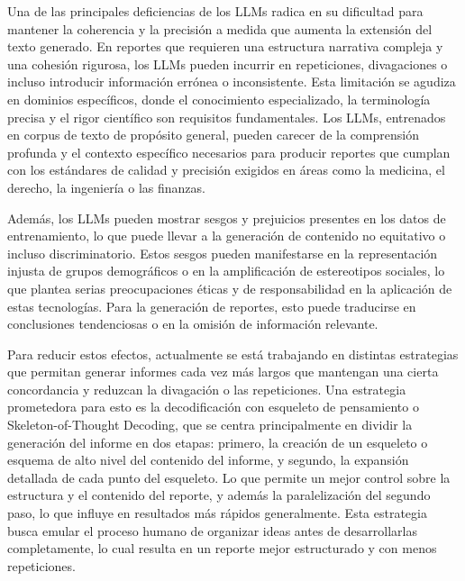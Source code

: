 Una de las principales deficiencias de los LLMs radica en su dificultad para mantener la coherencia y la precisión a medida que aumenta la extensión del texto generado. En reportes que requieren una estructura narrativa compleja y una cohesión rigurosa, los LLMs pueden incurrir en repeticiones, divagaciones o incluso introducir información errónea o inconsistente. Esta limitación se agudiza en dominios específicos, donde el conocimiento especializado, la terminología precisa y el rigor científico son requisitos fundamentales. Los LLMs, entrenados en corpus de texto de propósito general, pueden carecer de la comprensión profunda y el contexto específico necesarios para producir reportes que cumplan con los estándares de calidad y precisión exigidos en áreas como la medicina, el derecho, la ingeniería o las finanzas.

Además, los LLMs pueden mostrar sesgos y prejuicios presentes en los datos de entrenamiento, lo que puede llevar a la generación de contenido no equitativo o incluso discriminatorio. Estos sesgos pueden manifestarse en la representación injusta de grupos demográficos o en la amplificación de estereotipos sociales, lo que plantea serias preocupaciones éticas y de responsabilidad en la aplicación de estas tecnologías. Para la generación de reportes, esto puede traducirse en conclusiones tendenciosas o en la omisión de información relevante.

Para reducir estos efectos, actualmente se está trabajando en distintas estrategias que permitan generar informes cada vez más largos que mantengan una cierta concordancia y reduzcan la divagación o las repeticiones. Una estrategia prometedora para esto es la decodificación con esqueleto de pensamiento o Skeleton-of-Thought Decoding, que se centra principalmente en dividir la generación del informe en dos etapas: primero, la creación de un esqueleto o esquema de alto nivel del contenido del informe, y segundo, la expansión detallada de cada punto del esqueleto. Lo que permite un mejor control sobre la estructura y el contenido del reporte, y además la paralelización del segundo paso, lo que influye en resultados más rápidos generalmente. Esta estrategia busca emular el proceso humano de organizar ideas antes de desarrollarlas completamente, lo cual resulta en un reporte mejor estructurado y con menos repeticiones.

